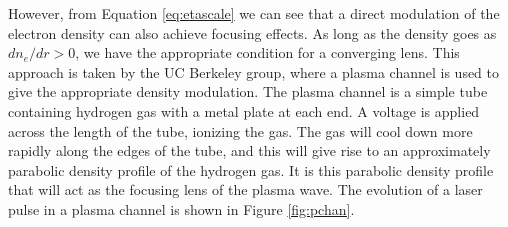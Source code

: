\documentclass[12pt,letter]{article}
\begin{document}
        However, from Equation \eqref{eq:etascale} we can see that a direct
    modulation of the electron density can also achieve focusing
    effects. As long as the density goes as $dn_e/dr >0$, we have the
    appropriate condition for a converging lens. This approach is taken by
    the UC Berkeley group, where a plasma channel is used to give the
    appropriate density modulation. The plasma channel is a simple tube containing
hydrogen gas with a metal plate at each end. A voltage is applied across the
length of the tube, ionizing the gas. The gas will cool down more rapidly along
the edges of the tube, and this will give rise to an approximately parabolic
density profile of the hydrogen
gas\cite{PhysRevLett.89.185003,PhysRevE.63.015401}. It is this parabolic density
profile that
will act as the focusing lens of the plasma wave. The evolution of a laser pulse
in a plasma channel is shown in Figure \ref{fig:pchan}. 
\end{document}
